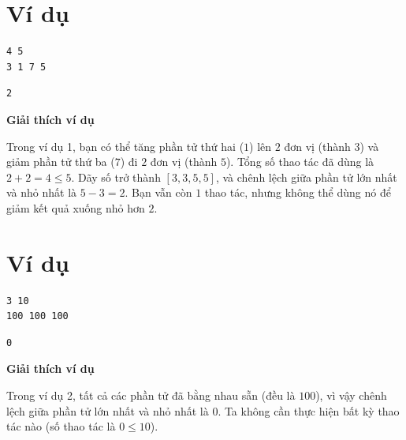 \documentclass[12pt,a4paper]{article}
\newcommand{\explanation}{%
  \vspace{6pt}\textbf{\textcolor{sectioncolor}{Giải thích ví dụ}}\par\vspace{2pt}%
}
\begin{document}
\section*{Ví dụ}
\begin{inputbox}
\begin{lstlisting}
4 5
3 1 7 5
\end{lstlisting}
\end{inputbox}
\begin{outputbox}
\begin{lstlisting}
2
\end{lstlisting}
\end{outputbox}
\explanation
Trong ví dụ 1, bạn có thể tăng phần tử thứ hai ($1$) lên $2$ đơn vị (thành $3$) và giảm phần tử thứ ba ($7$) đi $2$ đơn vị (thành $5$). Tổng số thao tác đã dùng là $2 + 2 = 4 \le 5$. Dãy số trở thành $[3, 3, 5, 5]$, và chênh lệch giữa phần tử lớn nhất và nhỏ nhất là $5 - 3 = 2$. Bạn vẫn còn $1$ thao tác, nhưng không thể dùng nó để giảm kết quả xuống nhỏ hơn $2$.

\section*{Ví dụ}
\begin{inputbox}
\begin{lstlisting}
3 10
100 100 100
\end{lstlisting}
\end{inputbox}
\begin{outputbox}
\begin{lstlisting}
0
\end{lstlisting}
\end{outputbox}
\explanation
Trong ví dụ 2, tất cả các phần tử đã bằng nhau sẵn (đều là $100$), vì vậy chênh lệch giữa phần tử lớn nhất và nhỏ nhất là $0$. Ta không cần thực hiện bất kỳ thao tác nào (số thao tác là $0 \le 10$).
\end{document}
